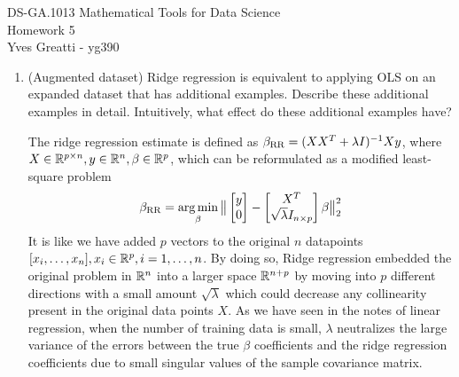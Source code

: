 \documentclass[12pt,twoside]{article}
\begin{document}
\noindent DS-GA.1013 Mathematical Tools for Data Science \\
Homework 5\\
Yves Greatti - yg390\\

\begin{enumerate}

\item (Augmented dataset) Ridge regression is equivalent to applying OLS on an expanded dataset that has additional examples. Describe these additional examples in detail. Intuitively, what effect do these additional examples have?\\
\medskip

The ridge regression estimate is defined as $\beta_{\operatorname{RR}} = (X X^T + \lambda I)^{-1} X y$, where $X \in \mathbb{R}^{p \times n}, y \in \mathbb{R}^n, \beta \in \mathbb{R}^p$, which can be reformulated as a modified least-square problem
$$\beta_{\operatorname{RR}} = \operatorname*{arg\,min}_\beta \big\| \begin{bmatrix} y   \\ 0 \end{bmatrix} - \begin{bmatrix} X^T   \\ \sqrt{\lambda} I_{n \times p} \end{bmatrix} \beta \big\|_2^2$$
It is like we have added $p$ vectors to the original $n$ datapoints $[x_i, \ldots, x_n], x_i \in \mathbb{R}^p, i=1, \ldots, n$. By doing so, Ridge regression embedded the original problem in $\mathbb{R}^n$ into a larger space $\mathbb{R}^{n+p}$ by moving into $p$ different 
directions with a small amount $\sqrt{\lambda}$ which could decrease any collinearity present in the original data points $X$. As we have seen in the notes of linear regression, when the number of training data is small, $\lambda$ neutralizes the large variance of the errors between the true  $\beta$ coefficients and the ridge regression coefficients due to small singular values  of the sample covariance matrix.
 
 \newpage
 

\end{enumerate}
\end{document}
